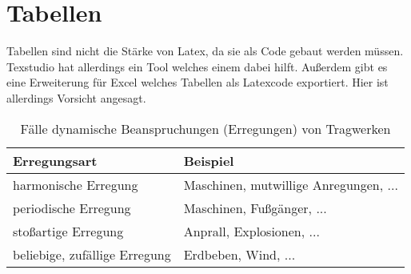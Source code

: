 \section{Tabellen}
\label{sec:tabelle}
Tabellen sind nicht die Stärke von Latex, da sie als Code gebaut werden müssen. Texstudio hat allerdings ein Tool welches einem dabei hilft. Außerdem gibt es eine Erweiterung für Excel welches Tabellen als Latexcode exportiert. Hier ist allerdings Vorsicht angesagt.
\begin{table}[h]
	\centering
	\caption{Fälle dynamische Beanspruchungen (Erregungen) von Tragwerken}	
	\begin{tabular}{ll}
		\toprule
		\textbf{Erregungsart} & \textbf{Beispiel} \\\midrule
		harmonische Erregung & Maschinen, mutwillige Anregungen, ...\\ 
		periodische Erregung & Maschinen, Fußgänger, ...\\ 
		stoßartige Erregung & Anprall, Explosionen, ...\\ 
		beliebige, zufällige Erregung & Erdbeben, Wind, ...\\ \bottomrule
	\end{tabular} 
\end{table}
\clearpage